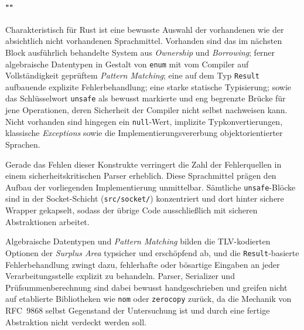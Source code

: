 \paragraph{""}
Charakteristisch für Rust ist eine bewusste Auswahl der vorhandenen wie der absichtlich nicht vorhandenen Sprachmittel.
Vorhanden sind das im nächsten Block ausführlich behandelte System aus \textit{Ownership} und \textit{Borrowing};
ferner algebraische Datentypen in Gestalt von \texttt{enum} mit vom Compiler auf Vollständigkeit geprüftem
\textit{Pattern Matching}; eine auf dem Typ \texttt{Result} aufbauende explizite Fehlerbehandlung; eine starke
statische Typisierung; sowie das Schlüsselwort \texttt{unsafe} als bewusst markierte und eng begrenzte Brücke für
jene Operationen, deren Sicherheit der Compiler nicht selbst nachweisen kann. Nicht vorhanden sind hingegen ein
\texttt{null}-Wert, implizite Typkonvertierungen, klassische \textit{Exceptions} sowie die
Implementierungsvererbung objektorientierter Sprachen.

Gerade das Fehlen dieser Konstrukte verringert die Zahl der Fehlerquellen in einem sicherheitskritischen
Parser erheblich. Diese Sprachmittel prägen den Aufbau der vorliegenden Implementierung unmittelbar.
Sämtliche \texttt{unsafe}-Blöcke sind in der Socket-Schicht (\texttt{src/socket/}) konzentriert und dort
hinter sichere Wrapper gekapselt, sodass der übrige Code ausschließlich mit sicheren Abstraktionen arbeitet.

Algebraische Datentypen und \textit{Pattern Matching} bilden die TLV-kodierten Optionen der
\textit{Surplus Area} typsicher und erschöpfend ab, und die \texttt{Result}-basierte Fehlerbehandlung
zwingt dazu, fehlerhafte oder bösartige Eingaben an jeder Verarbeitungsstelle explizit zu behandeln.
Parser, Serializer und Prüfsummenberechnung sind dabei bewusst handgeschrieben und greifen nicht auf
etablierte Bibliotheken wie \texttt{nom} oder \texttt{zerocopy} zurück, da die Mechanik von RFC~9868
selbst Gegenstand der Untersuchung ist und durch eine fertige Abstraktion nicht verdeckt werden soll.

